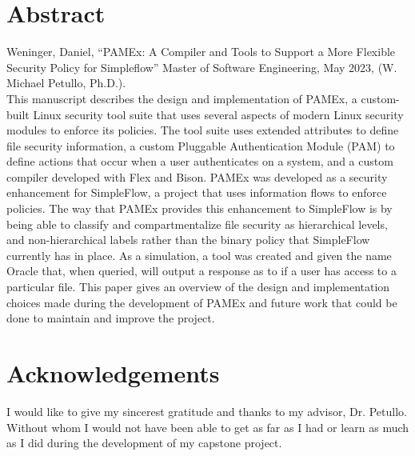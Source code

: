 \documentclass[letterpaper,12pt]{report}
\begin{document}
	
\clearpage


\clearpage

\setcounter{page}{1}
\renewcommand\arraystretch{1.5}

\vspace*{0.5in}
\section*{Abstract}
Weninger, Daniel, ``PAMEx: A Compiler and Tools to Support a 
More Flexible Security Policy for Simpleflow'' Master of Software 
Engineering, May 2023, (W. Michael Petullo, Ph.D.). \\

This manuscript describes the design and implementation of PAMEx, a custom-built Linux security tool 
suite that uses several aspects of modern Linux security modules to enforce its policies. 
The tool suite uses extended attributes to define file security information, a custom Pluggable Authentication Module (PAM) 
to define actions that occur when a user authenticates on a system, 
and a custom compiler developed with Flex and Bison. PAMEx was developed as a security enhancement for SimpleFlow, 
a project that uses information flows to enforce policies. The way that PAMEx provides this enhancement to SimpleFlow 
is by being able to classify and compartmentalize file security as hierarchical levels, and non-hierarchical labels 
rather than the binary policy that SimpleFlow currently has in place. 
As a simulation, a tool was created and given the name Oracle that, when queried, 
will output a response as to if a user has access to a particular file. This paper gives an overview of the design and 
implementation choices made during the development of PAMEx and future work that could be done to maintain and improve the project. 
\clearpage

\vspace*{0.5in}
\section*{Acknowledgements}
I would like to give my sincerest gratitude and thanks to my advisor, Dr. Petullo. Without whom I would not have been able to get as far as I had or learn as much as I did during the development of my capstone project.
\clearpage
\end{document}
